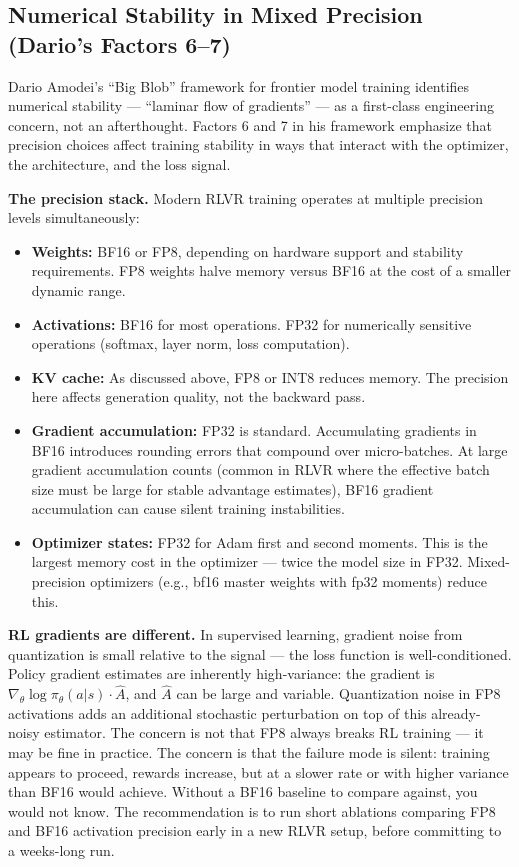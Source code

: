 \subsection{Numerical Stability in Mixed Precision (Dario's Factors 6--7)}

Dario Amodei's ``Big Blob'' framework for frontier model training identifies numerical stability --- ``laminar flow of gradients'' --- as a first-class engineering concern, not an afterthought. Factors 6 and 7 in his framework emphasize that precision choices affect training stability in ways that interact with the optimizer, the architecture, and the loss signal.

\textbf{The precision stack.} Modern RLVR training operates at multiple precision levels simultaneously:
\begin{itemize}
  \item \textbf{Weights:} BF16 or FP8, depending on hardware support and stability requirements. FP8 weights halve memory versus BF16 at the cost of a smaller dynamic range.
  \item \textbf{Activations:} BF16 for most operations. FP32 for numerically sensitive operations (softmax, layer norm, loss computation).
  \item \textbf{KV cache:} As discussed above, FP8 or INT8 reduces memory. The precision here affects generation quality, not the backward pass.
  \item \textbf{Gradient accumulation:} FP32 is standard. Accumulating gradients in BF16 introduces rounding errors that compound over micro-batches. At large gradient accumulation counts (common in RLVR where the effective batch size must be large for stable advantage estimates), BF16 gradient accumulation can cause silent training instabilities.
  \item \textbf{Optimizer states:} FP32 for Adam first and second moments. This is the largest memory cost in the optimizer --- twice the model size in FP32. Mixed-precision optimizers (e.g., bf16 master weights with fp32 moments) reduce this.
\end{itemize}

\textbf{RL gradients are different.} In supervised learning, gradient noise from quantization is small relative to the signal --- the loss function is well-conditioned. Policy gradient estimates are inherently high-variance: the gradient is $\nabla_\theta \log \pi_\theta(a|s) \cdot \hat{A}$, and $\hat{A}$ can be large and variable. Quantization noise in FP8 activations adds an additional stochastic perturbation on top of this already-noisy estimator. The concern is not that FP8 always breaks RL training --- it may be fine in practice. The concern is that the failure mode is silent: training appears to proceed, rewards increase, but at a slower rate or with higher variance than BF16 would achieve. Without a BF16 baseline to compare against, you would not know. The recommendation is to run short ablations comparing FP8 and BF16 activation precision early in a new RLVR setup, before committing to a weeks-long run.

